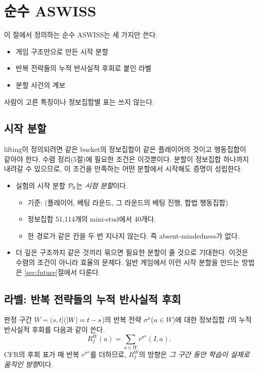 \section{순수 ASWISS}\label{sec:method}

이 절에서 정의하는 순수 ASWISS는 세 가지만 쓴다.
\begin{itemize}
  \item 게임 구조만으로 만든 시작 분할
  \item 반복 전략들의 누적 반사실적 후회로 붙인 라벨
  \item 분할 사건의 계보
\end{itemize}
사람이 고른 특징이나 정보집합별 표는 쓰지 않는다.

\subsection{시작 분할}\label{sec:p0}
lifting이 정의되려면 같은 bucket의 정보집합이 같은 플레이어의 것이고 행동집합이 같아야 한다. 수렴 정리(5절)에 필요한 조건은 이것뿐이다.
분할이 정보집합 하나까지 내려갈 수 있으므로, 이 조건을 만족하는 어떤 분할에서 시작해도 증명이 성립한다.
\begin{itemize}
  \item 실험의 시작 분할 $\mathcal{P}_0$는 \emph{시점 분할}이다.
    \begin{itemize}
      \item 기준: (플레이어, 베팅 라운드, 그 라운드의 베팅 진행, 합법 행동집합)
      \item 정보집합 51,114개의 mini-stud에서 40개다.
      \item 한 경로가 같은 칸을 두 번 지나지 않는다. 즉 absent-mindedness가 없다.
    \end{itemize}
  \item 더 깊은 구조까지 같은 것끼리 묶으면 필요한 분할이 줄 것으로 기대한다. 이것은 수렴의 조건이 아니라 효율의 문제다. 일반 게임에서 이런 시작 분할을 만드는 방법은 \ref{sec:future}절에서 다룬다.
\end{itemize}

\subsection{라벨: 반복 전략들의 누적 반사실적 후회}\label{sec:label}
판정 구간 $W=(s,t]$($\left\lvert W\right\rvert=t-s$)의 반복 전략 $\sigma^u$($u\in W$)에 대한 정보집합 $I$의 누적 반사실적 후회를 다음과 같이 쓴다.
\[
R_I^W(a)=\sum_{u\in W}r^{\sigma^u}(I,a).
\]
CFR의 후회 표가 매 반복 $r^{\sigma^u}$를 더하므로, $R_I^W$의 방향은 \emph{그 구간 동안 학습이 실제로 움직인 방향}이다.

